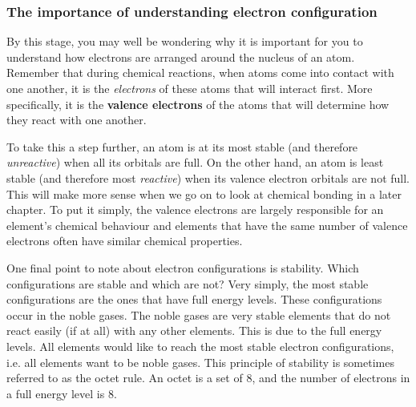             \subsubsection{ The importance of understanding electron configuration}
            \nopagebreak
        \label{m38741*id260011}By this stage, you may well be wondering why it is important for you to understand how electrons are arranged around the nucleus of an atom. Remember that during chemical reactions, when atoms come into contact with one another, it is the \textsl{electrons} of these atoms that will interact first. More specifically, it is the \textbf{valence electrons} of the atoms that will determine how they react with one another.\par 
        \label{m38741*id260029}To take this a step further, an atom is at its most stable (and therefore \textsl{unreactive}) when all its orbitals are full. On the other hand, an atom is least stable (and therefore most \textsl{reactive}) when its valence electron orbitals are not full. This will make more sense when we go on to look at chemical bonding in a later chapter. To put it simply, the valence electrons are largely responsible for an element's chemical behaviour and elements that have the same number of valence electrons often have similar chemical properties.\par 
\label{m38741*eip-106}One final point to note about electron configurations is stability. Which configurations are stable and which are not? Very simply, the most stable configurations are the ones that have full energy levels. These configurations occur in the noble gases. The noble gases are very stable elements that do not react easily (if at all) with any other elements. This is due to the full energy levels. All elements would like to reach the most stable electron configurations, i.e. all elements want to be noble gases. This principle of stability is sometimes referred to as the octet rule. An octet is a set of 8, and the number of electrons in a full energy level is 8. \par \label{m38741*eip-739}
